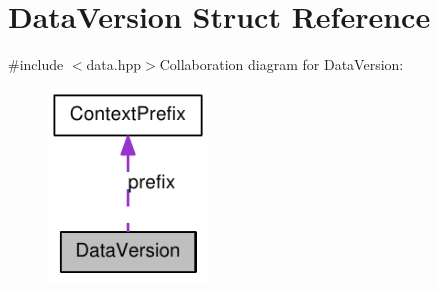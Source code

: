 \hypertarget{struct_data_version}{
\section{DataVersion Struct Reference}
\label{struct_data_version}
}


{\ttfamily \#include $<$data.hpp$>$}Collaboration diagram for DataVersion:\nopagebreak
\begin{figure}[H]
\begin{center}
\leavevmode
\includegraphics[width=120pt]{struct_data_version__coll__graph}
\end{center}
\end{figure}
